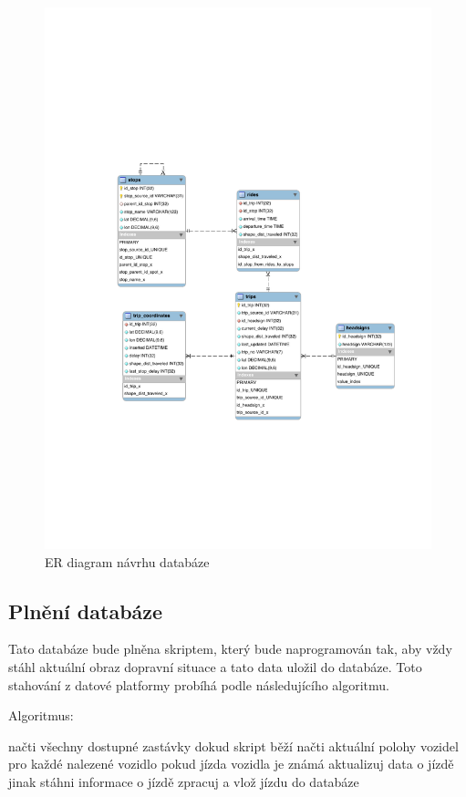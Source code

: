 \begin{figure}[p]\centering
\includegraphics[width=\linewidth]{../img/eer_database}
\caption{ER diagram návrhu databáze}
\label{obr:EER}
\end{figure}

\subsection{Plnění databáze}


Tato databáze bude plněna skriptem, který bude naprogramován tak, aby vždy stáhl aktuální obraz dopravní situace a tato data uložil do databáze. Toto stahování z datové platformy probíhá podle následujícího algoritmu.


\bigbreak


Algoritmus:
\begin{code}[frame=none]
načti všechny dostupné zastávky
dokud skript běží
  načti aktuální polohy vozidel
  pro každé nalezené vozidlo
  pokud jízda vozidla je známá
    aktualizuj data o jízdě
  jinak
    stáhni informace o jízdě
    zpracuj a vlož jízdu do databáze
\end{code}


